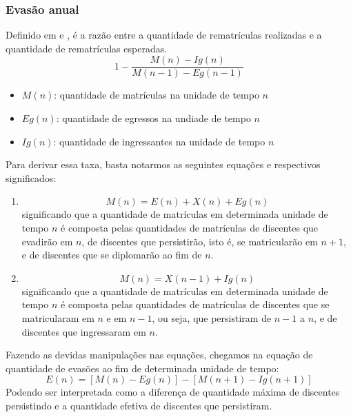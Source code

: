 \documentclass{report}
\begin{document}

\subsubsection{Evasão anual}

Definido em \cite{esclarecimentos_calculos} e \cite{mudanca_calculos}, é a razão entre a quantidade de rematrículas realizadas e a quantidade de rematrículas esperadas.
\begin{equation}
1 - \frac{M(n) - Ig(n)}{M(n-1) - Eg(n-1)}
\end{equation}
\begin{itemize}
\item $M(n)$: quantidade de matrículas na unidade de tempo $n$
\item $Eg(n)$: quantidade de egressos na undiade de tempo $n$
\item $Ig(n)$: quantidade de ingressantes na unidade de tempo $n$
\end{itemize}

Para derivar essa taxa, basta notarmos as seguintes equações e respectivos significados:
\begin{enumerate}
\item 
\begin{equation}
M(n) = E(n) + X(n) + Eg(n)
\end{equation}
significando que a quantidade de matrículas em determinada unidade de tempo $n$ é composta pelas quantidades de matrículas de discentes que evadirão em $n$, de discentes que persistirão, isto é, se matricularão em $n+1$, e de discentes que se diplomarão ao fim de $n$.
\item 
\begin{equation}
M(n) = X(n-1) + Ig(n)
\end{equation}
significando que a quantidade de matrículas em determinada unidade de tempo $n$ é composta pelas quantidades de matrículas de discentes que se matricularam em $n$ e em $n-1$, ou seja, que persistiram de $n-1$ a $n$, e de discentes que ingressaram em $n$.
\end{enumerate}

Fazendo as devidas manipulações nas equações, chegamos na equação de quantidade de evasões ao fim de determinada unidade de tempo:
\begin{equation}
E(n) = [M(n) - Eg(n)] - [M(n+1) - Ig(n+1)]
\end{equation}
Podendo ser interpretada como a diferença de quantidade máxima de discentes persistindo e a quantidade efetiva de discentes que persistiram.
\end{document}
